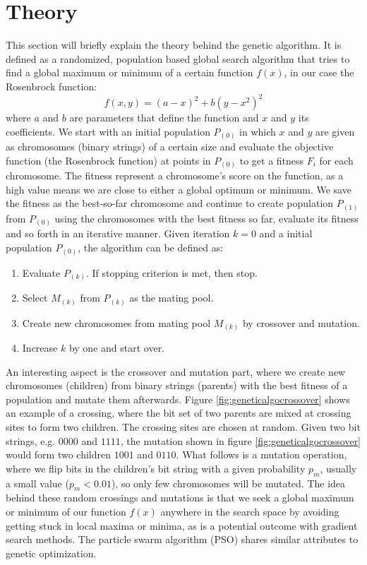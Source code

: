 \section{Theory}\label{sec:theory}

This section will briefly explain the theory behind the genetic algorithm. It is defined as a randomized, population based global search algorithm that tries to find a global maximum or minimum of a certain function $f(x)$, in our case the Rosenbrock function: $$f(x,y) = (a-x)^2+b(y-x^2)^2$$ where $a$ and $b$ are parameters that define the function and $x$ and $y$ its coefficients. We start with an initial population $P_{(0)}$ in which $x$ and $y$ are given as chromosomes (binary strings) of a certain size and evaluate the objective function (the Rosenbrock function\cite{Shang2006}) at points in $P_{(0)}$ to get a fitness $F_{i}$ for each chromosome. The fitness represent a chromosome's score on the function, as a high value means we are close to either a global optimum or minimum. We save the fitness as the best-so-far chromosome and continue to create population $P_{(1)}$ from $P_{(0)}$ using the chromosomes with the best fitness so far, evaluate its fitness and so forth in an iterative manner. Given iteration $k=0$ and a initial population $P_{(0)}$, the algorithm can be defined as\cite{Chong2013}:

\begin{enumerate}
	\item Evaluate $P_{(k)}$. If stopping criterion is met, then stop.
	\item Select $M_{(k)}$ from $P_{(k)}$ as the mating pool.
	\item Create new chromosomes from mating pool $M_{(k)}$ by crossover and mutation.
	\item Increase $k$ by one and start over.
\end{enumerate}

An interesting aspect is the crossover and mutation part, where we create new chromosomes (children) from binary strings (parents) with the best fitness of a population and mutate them afterwards. Figure \ref{fig:geneticalgocrossover} shows an example of a crossing, where the bit set of two parents are mixed at crossing sites to form two children. The crossing sites are chosen at random. Given two bit strings, e.g. $0000$ and $1111$, the mutation shown in figure \ref{fig:geneticalgocrossover} would form two children $1001$ and $0110$. What follows is a mutation operation, where we flip bits in the children's bit string with a given probability $p_{m}$, usually a small value ($p_{m} < 0.01$), so only few chromosomes will be mutated. The idea behind these random crossings and mutations is that we seek a global maximum or minimum of our function $f(x)$ anywhere in the search space by avoiding getting stuck in local maxima or minima, as is a potential outcome with gradient search methods. The particle swarm algorithm (PSO) shares similar attributes to genetic optimization.

